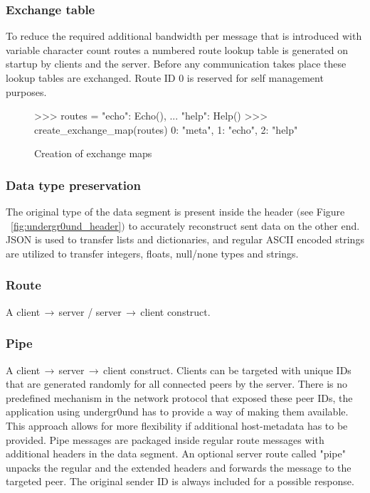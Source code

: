 \documentclass[conference]{IEEEtran}
\begin{document}
\subsubsection{Exchange table}
To reduce the required additional bandwidth per message that is introduced with variable character count routes a numbered route lookup table is generated on startup by clients and the server. Before any communication takes place these lookup tables are exchanged. Route ID 0 is reserved for self management purposes. 

\begin{figure}[H]
\centering
\begin{python}
>>> routes = {"echo": Echo(), 
...    "help": Help()}
>>> create_exchange_map(routes)
{0: "meta", 1: "echo", 2: "help"}
\end{python}
\caption{Creation of exchange maps}
\end{figure}

\subsubsection{Data type preservation}
The original type of the data segment is present inside the header $($see Figure ~\ref{fig:undergr0und_header}$)$ to accurately reconstruct sent data on the other end. JSON\cite{JSON:T. Bray Ed.} is used to transfer lists and dictionaries, and regular ASCII encoded strings are utilized to transfer integers, floats, null/none types and strings.

\subsubsection{Route}
A client$\,\to\,$server / server$\,\to\,$client construct. 

\subsubsection{Pipe}
A client$\,\to\,$server$\,\to\,$client construct. Clients can be targeted with unique IDs that are generated randomly for all connected peers by the server. There is no predefined mechanism in the network protocol that exposed these peer IDs, the application using undergr0und\cite{undergr0und:Philip Trauner} has to provide a way of making them available. This approach allows for more flexibility if additional host-metadata has to be provided.
Pipe messages are packaged inside regular route messages with additional headers in the data segment. An optional server route called {\color{deepgreen}"pipe"} unpacks the regular and the extended headers and forwards the message to the targeted peer. The original sender ID is always included for a possible response.
\end{document}
